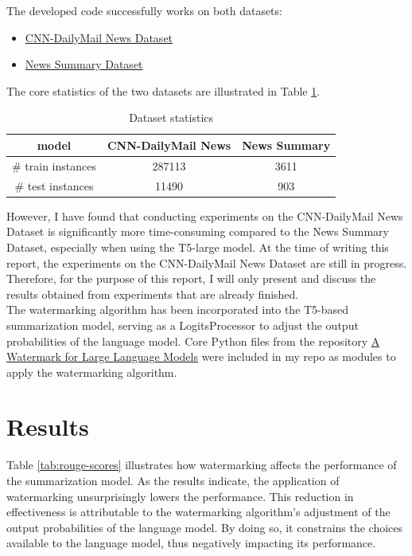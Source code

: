 \documentclass{article}
\begin{document}
The developed code successfully works on both datasets:
\begin{itemize}
	\item \href{https://www.kaggle.com/datasets/gowrishankarp/newspaper-text-summarization-cnn-dailymail}{CNN-DailyMail News Dataset}
	\item \href{https://www.kaggle.com/datasets/sunnysai12345/news-summary}{News Summary Dataset}
\end{itemize}

The core statistics of the two datasets are illustrated in Table \ref{tab:dataset_stat}.

\begin{table}[H]
	\begin{tabular}{|c|c|c|}
		\hline
		model              & CNN-DailyMail News & News Summary \\ \hline
		\# train instances & 287113            & 3611         \\ \hline
		\# test instances  & 11490             & 903          \\ \hline
	\end{tabular}
	\caption{Dataset statistics}
	\label{tab:dataset_stat}
\end{table}

However, I have found that conducting experiments on the CNN-DailyMail News Dataset is significantly more time-consuming compared to the News Summary Dataset, especially when using the T5-large model. At the time of writing this report, the experiments on the CNN-DailyMail News Dataset are still in progress. Therefore, for the purpose of this report, I will only present and discuss the results obtained from experiments that are already finished. \\

The watermarking algorithm has been incorporated into the T5-based summarization model, serving as a LogitsProcessor to adjust the output probabilities of the language model. Core Python files from the repository \href{https://github.com/jwkirchenbauer/lm-watermarking}{A Watermark for Large Language Models} were included in my repo as modules to apply the watermarking algorithm.

\section{Results}
Table \ref{tab:rouge-scores} illustrates how watermarking affects the performance of the summarization model. As the results indicate, the application of watermarking unsurprisingly lowers the performance. This reduction in effectiveness is attributable to the watermarking algorithm's adjustment of the output probabilities of the language model. By doing so, it constrains the choices available to the language model, thus negatively impacting its performance.\\
\end{document}
